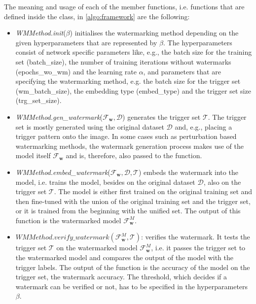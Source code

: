 The meaning and usage of each of the member functions, i.e. functions that are defined inside the class, in \cref{algo:framework} are the following:

\begin{itemize}
    \item \textit{WMMethod.init}($\beta$) initialises the watermarking method depending on the given hyperparameters that are represented by $\beta$. The hyperparameters consist of network specific parameters like, e.g., the batch size for the training set (batch\_size), the number of training iterations without watermarks (epochs\_wo\_wm) and the learning rate $\alpha$, and parameters that are specifying the watermarking method, e.g. the batch size for the trigger set (wm\_batch\_size), the embedding type (embed\_type) and the trigger set size (trg\_set\_size).
    
    \item \textit{WMMethod.gen\_watermark}($\mathcal{F}_{\mathbf{w}}, \mathcal{D}$) generates the trigger set $\mathcal{T}$. The trigger set is mostly generated using the original dataset $\mathcal{D}$ and, e.g., placing a trigger pattern onto the image. In some cases such as perturbation based watermarking methods, the watermark generation process makes use of the model itself $\mathcal{F}_{\mathbf{w}}$ and is, therefore, also passed to the function.
    
    \item \textit{WMMethod.embed\_watermark}($\mathcal{F}_{\mathbf{w}}, \mathcal{D}, \mathcal{T}$) embeds the watermark into the model, i.e. trains the model, besides on the original dataset $\mathcal{D}$, also on the trigger set $\mathcal{T}$. The model is either first trained on the original training set and then fine-tuned with the union of the original training set and the trigger set, or it is trained from the beginning with the unified set. The output of this function is the watermarked model $\mathcal{F}_{\mathbf{w}}^{M}$.
    
    \item $WMMethod.verify\_watermark(\mathcal{F}_{\mathbf{w}}^{M},\mathcal{T})$: verifies the watermark. It tests the trigger set $\mathcal{T}$ on the watermarked model $\mathcal{F}_{\mathbf{w}}^{M}$, i.e. it passes the trigger set to the watermarked model and compares the output of the model with the trigger labels. The output of the function is the accuracy of the model on the trigger set, the watermark accuracy. The threshold, which decides if a watermark can be verified or not, has to be specified in the hyperparameters $\beta$.
\end{itemize}

